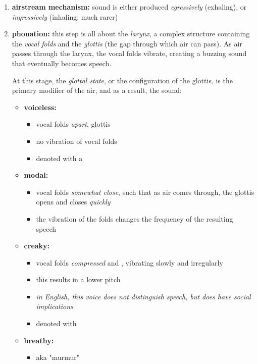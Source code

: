 \documentclass[12pt]{article}
\begin{document}
\begin{enumerate}
  \item \textbf{airstream mechanism:} sound is either produced \textit{egressively} (exhaling), or \textit{ingressively} (inhaling; much rarer)
  \item \textbf{phonation:} this step is all about the \textit{larynx}, a complex structure containing the \textit{vocal folds} and the \textit{glottis} (the gap through which air can pass). As air passes through the larynx, the vocal folds vibrate, creating a buzzing sound that eventually becomes speech.
  
  At this stage, the \textit{glottal state}, or the configuration of the glottis, is the primary modifier of the air, and as a result, the sound:

  \begin{itemize}
    \item \textbf{voiceless:}\begin{itemize}
      \item vocal folds \textit{apart}, glottis 
      \item no vibration of vocal folds
      \item denoted with a 
    \end{itemize}
    \item \textbf{modal:}\begin{itemize}
      \item vocal folds \textit{somewhat close}, such that as air comes through, the glottis opens and closes \textit{quickly}
      \item the vibration of the folds changes the frequency of the resulting speech
    \end{itemize}
    \item \textbf{creaky:}\begin{itemize}
      \item vocal folds \textit{compressed} and , vibrating slowly and irregularly
      \item this results in a lower pitch
      \item \textit{in English, this voice does not distinguish speech, but does have social implications}
      \item denoted with 
    \end{itemize}
    \item \textbf{breathy:}\begin{itemize}
      \item aka "murmur"

\end{itemize}
\end{itemize}
\end{enumerate}
\end{document}
